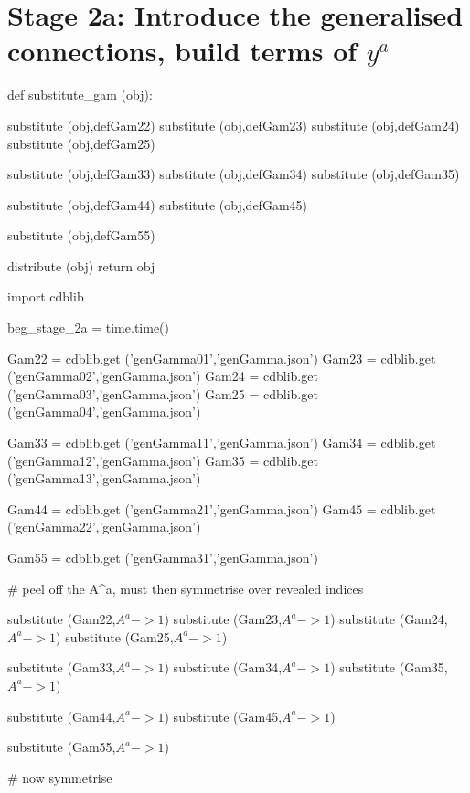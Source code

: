 \documentclass[12pt]{cdblatex}
\begin{document}
\clearpage

\section*{Stage 2a: Introduce the generalised connections, build terms of $y^{a}$}

\begin{cadabra}
   def substitute_gam (obj):

       substitute (obj,defGam22)
       substitute (obj,defGam23)
       substitute (obj,defGam24)
       substitute (obj,defGam25)

       substitute (obj,defGam33)
       substitute (obj,defGam34)
       substitute (obj,defGam35)

       substitute (obj,defGam44)
       substitute (obj,defGam45)

       substitute (obj,defGam55)

       distribute (obj)
       return obj

   import cdblib

   beg_stage_2a = time.time()

   Gam22 = cdblib.get ('genGamma01','genGamma.json')
   Gam23 = cdblib.get ('genGamma02','genGamma.json')
   Gam24 = cdblib.get ('genGamma03','genGamma.json')
   Gam25 = cdblib.get ('genGamma04','genGamma.json')

   Gam33 = cdblib.get ('genGamma11','genGamma.json')
   Gam34 = cdblib.get ('genGamma12','genGamma.json')
   Gam35 = cdblib.get ('genGamma13','genGamma.json')

   Gam44 = cdblib.get ('genGamma21','genGamma.json')
   Gam45 = cdblib.get ('genGamma22','genGamma.json')

   Gam55 = cdblib.get ('genGamma31','genGamma.json')

   # peel off the A^{a}, must then symmetrise over revealed indices

   substitute (Gam22,$A^{a}->1$)
   substitute (Gam23,$A^{a}->1$)
   substitute (Gam24,$A^{a}->1$)
   substitute (Gam25,$A^{a}->1$)

   substitute (Gam33,$A^{a}->1$)
   substitute (Gam34,$A^{a}->1$)
   substitute (Gam35,$A^{a}->1$)

   substitute (Gam44,$A^{a}->1$)
   substitute (Gam45,$A^{a}->1$)

   substitute (Gam55,$A^{a}->1$)

   # now symmetrise


\end{cadabra}
\end{document}
